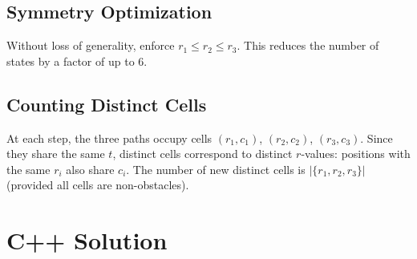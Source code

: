 \documentclass[11pt,a4paper]{article}
\begin{document}
\subsection{Symmetry Optimization}

Without loss of generality, enforce $r_1 \le r_2 \le r_3$. This reduces the number of
states by a factor of up to 6.

\subsection{Counting Distinct Cells}

At each step, the three paths occupy cells $(r_1, c_1)$, $(r_2, c_2)$, $(r_3, c_3)$.
Since they share the same $t$, distinct cells correspond to distinct $r$-values:
positions with the same $r_i$ also share $c_i$. The number of new distinct cells
is $|\{r_1, r_2, r_3\}|$ (provided all cells are non-obstacles).

\section{C++ Solution}
\end{document}

